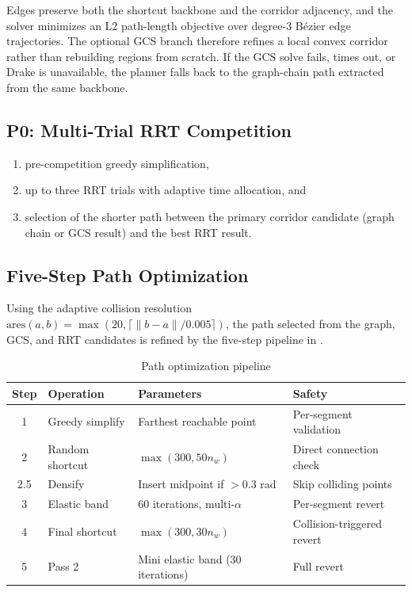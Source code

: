 \documentclass[journal]{IEEEtran}
\begin{document}
Edges preserve both the shortcut backbone and the corridor adjacency,
and the solver minimizes an L2 path-length objective over degree-3
B\'ezier edge trajectories. The optional GCS branch therefore refines a
local convex corridor rather than rebuilding regions from scratch. If
the GCS solve fails, times out, or Drake is unavailable, the planner
falls back to the graph-chain path extracted from the same backbone.

\subsection{P0: Multi-Trial RRT Competition}

\begin{enumerate}[nosep]
  \item pre-competition greedy simplification,
  \item up to three RRT trials with adaptive time allocation, and
  \item selection of the shorter path between the primary corridor
    candidate (graph chain or GCS result) and the best RRT result.
\end{enumerate}

\subsection{Five-Step Path Optimization}

Using the adaptive collision resolution
$\mathrm{ares}(a,b) = \max(20, \lceil\|b-a\|/0.005\rceil)$, the path
selected from the graph, GCS, and RRT candidates is refined by the
five-step pipeline in .

\begin{table}[ht]
\centering
\caption{Path optimization pipeline}
\label{tab:pipeline}
\small
\begin{tabularx}{\columnwidth}{@{}c l X X@{}}
\toprule
\textbf{Step} & \textbf{Operation} & \textbf{Parameters} & \textbf{Safety} \\
\midrule
1 & Greedy simplify & Farthest reachable point & Per-segment validation \\
2 & Random shortcut & $\max(300, 50 n_w)$ & Direct connection check \\
2.5 & Densify & Insert midpoint if $> 0.3$ rad & Skip colliding points \\
3 & Elastic band & 60 iterations, multi-$\alpha$ & Per-segment revert \\
4 & Final shortcut & $\max(300, 30 n_w)$ & Collision-triggered revert \\
5 & Pass 2 & Mini elastic band (30 iterations) & Full revert \\
\bottomrule
\end{tabularx}
\end{table}
\end{document}
